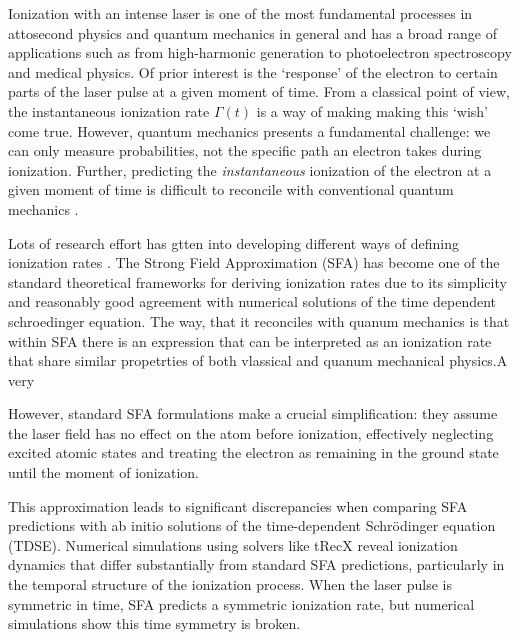Ionization with an intense laser is one of the most fundamental processes in attosecond physics and quantum mechanics in general and has a broad range of applications such as from high-harmonic generation to photoelectron spectroscopy and medical physics.
Of prior interest is the `response' of the electron to certain parts of the laser pulse at a given moment of time.
From a classical point of view, the instantaneous ionization rate $\Gamma(t)$ is a way of making making this `wish' come true.
However, quantum mechanics presents a fundamental challenge: we can only measure probabilities, not the specific path an electron takes during ionization.
Further, predicting the \emph{instantaneous} ionization of the electron at a given moment of time is difficult to reconcile with conventional quantum mechanics \cite{Ivanov2018}. 

\medskip
Lots of research effort has gtten into developing different ways of defining ionization rates \cite{agarwal2025generalapproximatorstrongfieldionization,Ivanov2018}.
The Strong Field Approximation (SFA) has become one of the standard theoretical frameworks for deriving ionization rates due to its simplicity and reasonably good agreement with numerical solutions of the time dependent schroedinger equation. 
The way, that it reconciles with quanum mechanics is that within SFA there is an expression that can be interpreted as an ionization rate that share similar propetrties of both vlassical and quanum mechanical physics.A very

However, standard SFA formulations make a crucial simplification: they assume the laser field has no effect on the atom before ionization, effectively neglecting excited atomic states and treating the electron as remaining in the ground state until the moment of ionization.

This approximation leads to significant discrepancies when comparing SFA predictions with ab initio solutions of the time-dependent Schrödinger equation (TDSE). 
Numerical simulations using solvers like tRecX reveal ionization dynamics that differ substantially from standard SFA predictions, particularly in the temporal structure of the ionization process. 
When the laser pulse is symmetric in time, SFA predicts a symmetric ionization rate, but numerical simulations show this time symmetry is broken.

